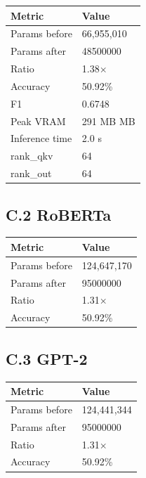 \begin{table}[H]
\centering
\small
\begin{tabular}{ll}
\toprule
\textbf{Metric} & \textbf{Value} \\
\midrule
Params before & 66,955,010 \\
Params after & 48500000 \\
Ratio & 1.38$\times$ \\
Accuracy & 50.92\% \\
F1 & 0.6748 \\
Peak VRAM & 291 MB MB \\
Inference time & 2.0 s \\
rank\_qkv & 64 \\
rank\_out & 64 \\
\bottomrule
\end{tabular}
\end{table}

\subsection{C.2 RoBERTa}

\begin{table}[H]
\centering
\small
\begin{tabular}{ll}
\toprule
\textbf{Metric} & \textbf{Value} \\
\midrule
Params before & 124,647,170 \\
Params after & 95000000 \\
Ratio & 1.31$\times$ \\
Accuracy & 50.92\% \\
\bottomrule
\end{tabular}
\end{table}

\subsection{C.3 GPT-2}

\begin{table}[H]
\centering
\small
\begin{tabular}{ll}
\toprule
\textbf{Metric} & \textbf{Value} \\
\midrule
Params before & 124,441,344 \\
Params after & 95000000 \\
Ratio & 1.31$\times$ \\
Accuracy & 50.92\% \\
\bottomrule
\end{tabular}
\end{table}

